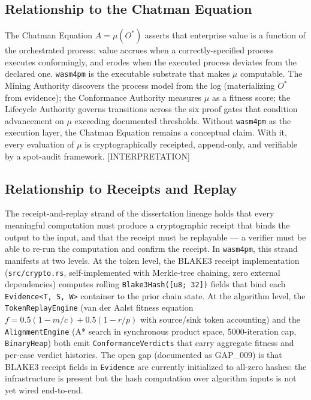 \subsection{Relationship to the Chatman Equation}
\label{sec:sources-wasm4pm-lineage-chatman-equation}

The Chatman Equation \(A = \mu(O^*)\) asserts that enterprise value is a function of the
orchestrated process: value accrues when a correctly-specified process executes conformingly, and
erodes when the executed process deviates from the declared one. \texttt{wasm4pm} is the
executable substrate that makes $\mu$ computable. The Mining Authority discovers the process
model from the log (materializing $O^*$ from evidence); the Conformance Authority measures
$\mu$ as a fitness score; the Lifecycle Authority governs transitions across the six proof gates
that condition advancement on $\mu$ exceeding documented thresholds. Without \texttt{wasm4pm} as
the execution layer, the Chatman Equation remains a conceptual claim. With it, every evaluation
of $\mu$ is cryptographically receipted, append-only, and verifiable by a spot-audit framework.
[INTERPRETATION]

\subsection{Relationship to Receipts and Replay}
\label{sec:sources-wasm4pm-lineage-receipts-replay}

The receipt-and-replay strand of the dissertation lineage holds that every meaningful computation
must produce a cryptographic receipt that binds the output to the input, and that the receipt must
be replayable — a verifier must be able to re-run the computation and confirm the receipt. In
\texttt{wasm4pm}, this strand manifests at two levels. At the token level, the BLAKE3 receipt
implementation (\texttt{src/crypto.rs}, self-implemented with Merkle-tree chaining, zero external
dependencies) computes rolling \texttt{Blake3Hash([u8;~32])} fields that bind each
\texttt{Evidence<T,~S,~W>} container to the prior chain state. At the algorithm level, the
\texttt{TokenReplayEngine} (van der Aalst fitness equation $f = 0.5(1-m/c) + 0.5(1-r/p)$ with
source/sink token accounting) and the \texttt{AlignmentEngine} (A* search in synchronous product
space, 5000-iteration cap, \texttt{BinaryHeap}) both emit \texttt{ConformanceVerdicts} that carry
aggregate fitness and per-case verdict histories. The open gap (documented as GAP\_009) is that
BLAKE3 receipt fields in \texttt{Evidence} are currently initialized to all-zero hashes: the
infrastructure is present but the hash computation over algorithm inputs is not yet wired end-to-end.
